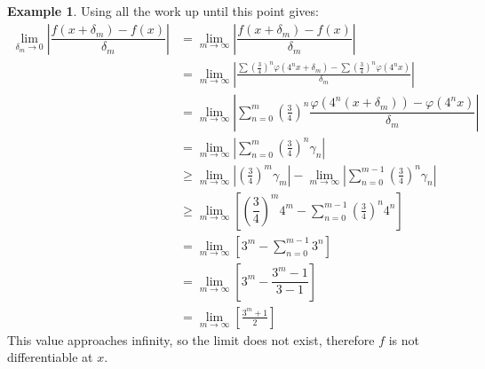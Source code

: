 \documentclass{article}
\theoremstyle{definition}
\newtheorem{example}{Example}[section]
\begin{document}
\begin{example}
Using all the work up until this point gives:
\begin{align*}
\lim\limits_{\delta_m\to 0}\left\lvert \dfrac{f(x + \delta_m)- f(x)}{\delta_m}\right\rvert & = \lim\limits_{m\to \infty}\left\lvert \dfrac{f(x + \delta_m)- f(x)}{\delta_m}\right\rvert \\
& = \lim\limits_{m\to \infty}\left\lvert \frac{\sum\left(\frac{3}{4}\right)^n\varphi(4^nx + \delta_m) - \sum\left(\frac{3}{4}\right)^n\varphi(4^nx)}{\delta_m}\right\rvert \\& = \lim\limits_{m\to \infty}\left\lvert  \sum_{n=0}^{m}\left(\frac{3}{4}\right)^n\dfrac{\varphi(4^n(x+\delta_m)) - \varphi(4^nx)}{\delta_m}\right\rvert \\ & = \lim\limits_{m\to \infty}\left\lvert  \sum_{n=0}^{m}\left(\frac{3}{4}\right)^n\gamma_n\right\rvert\\ & \ge\lim\limits_{m\to \infty}\left\lvert \left(\frac{3}{4}\right)^m\gamma_m\right\rvert -  \lim\limits_{m\to \infty}\left\lvert \sum_{n=0}^{m-1}\left(\frac{3}{4}\right)^n\gamma_n\right\rvert\\ & \ge \lim\limits_{m\to \infty} \left[\left(\dfrac{3}{4}\right)^m4^m - \sum_{n=0}^{m-1}\left(\frac{3}{4}\right)^n4^n\right]\\ & = \lim\limits_{m\to\infty}\left[3^m - \sum_{n=0}^{m-1}3^n\right] \\& = \lim\limits_{m\to\infty}\left[3^m - \dfrac{3^m-1}{3-1}\right] \\ & = \lim\limits_{m\to\infty}\left[\frac{3^m+1}{2}\right] 
\end{align*}
This value approaches infinity, so the limit does not exist, therefore $ f $ is not differentiable at $ x $. 
 \end{example}
\end{document}
